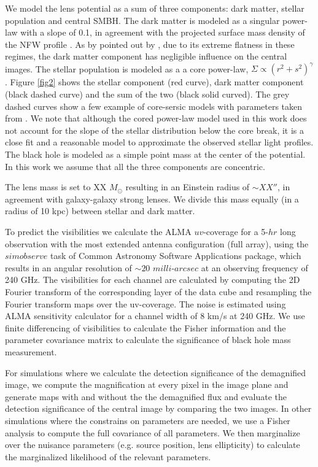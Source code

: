 \documentclass[chicago]{emulateapj}
\begin{document}
We model the lens potential as a sum of three components: dark matter, stellar population and central SMBH. The dark matter is modeled as a singular power-law with a slope of 0.1, in agreement with the projected surface mass density of the NFW profile \citep{Golse:02}. As by pointed out by \citep{Keeton:03}, due to its extreme flatness in these regimes, the dark matter component has negligible influence on the central images. 
The stellar population is modeled as a a core power-law, $\Sigma\propto (r^2+s^2)^{\gamma}$. Figure \ref{fig2} shows the stellar component (red curve), dark matter component (black dashed curve) and the sum of the two (black solid curved). The grey dashed curves show a few example of core-sersic models with parameters taken from \citet{Ferrarese:06}. We note that although the cored power-law model used in this work does not account for the slope of the stellar distribution below the core break, it is a close fit and a reasonable model to approximate the observed stellar light profiles. 
The black hole is modeled as a simple point mass at the center of the potential. In this work we assume that all the three components are concentric.

The lens mass is set to XX $M_{\odot}$ resulting in an Einstein radius of $\sim XX''$, in agreement with galaxy-galaxy strong lenses. We divide this mass equally (in a radius of 10 kpc) between stellar and dark matter. 

To predict the visibilities we calculate the ALMA $uv$-coverage for a 5-$hr$ long observation with the most extended antenna configuration (full array), using the $simobserve$ task of Common Astronomy Software Applications package, which results in an angular resolution of $\sim20\, \, milli$-$arcsec$ at an observing frequency of 240 GHz. 
The visibilities for each channel are calculated by computing the 2D Fourier transform of the corresponding layer of the data cube and resampling the Fourier transform maps over the uv-coverage. 
The noise is estimated using ALMA sensitivity calculator for a channel width of 8 km/s at 240 GHz. 
We use finite differencing of visibilities to calculate the Fisher information and the parameter covariance matrix to calculate the significance of black hole mass measurement.


For simulations where we calculate the detection significance of the demagnified image, we compute the magnification at every pixel in the image plane and generate maps with and without the the demagnified flux and evaluate the detection significance of the central image by comparing the two images. In other simulations where the constrains on parameters are needed, we use a Fisher analysis to compute the full covariance of all parameters. We then marginalize over the nuisance parameters (e.g. source position, lens ellipticity) to calculate the marginalized likelihood of the relevant parameters. 
\end{document}

